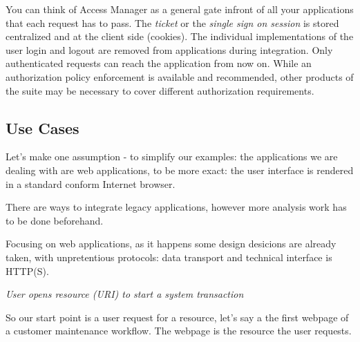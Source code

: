 You can think of Access Manager as a general gate infront of all your applications that each request has to pass. The \emph{ticket} or the \emph{single sign on session} is stored centralized and at the client side (cookies). The individual implementations of the user login and logout are removed from applications during integration. Only authenticated requests can reach the application from now on. While an authorization policy enforcement is available and recommended, other products of the suite may be necessary to cover different authorization requirements.


\subsection{Use Cases}

Let's make one assumption - to simplify our examples: the applications we are dealing with are web applications, to be more exact: the user interface is rendered in a standard conform Internet browser.

There are ways to integrate legacy applications, however more analysis work has to be done beforehand. 

Focusing on web applications, as it happens some design desicions are already taken, with unpretentious protocols: data transport and technical interface is HTTP(S).

\emph{User opens resource (URI) to start a system transaction}

So our start point is a user request for a resource, let's say a the first webpage of a customer maintenance workflow. The webpage is the resource the user requests.






